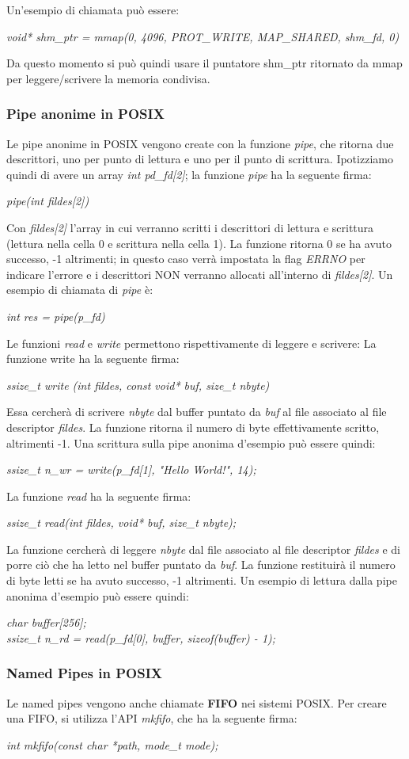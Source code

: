 \documentclass[12pt]{article}
\begin{document}
Un'esempio di chiamata può essere:
\begin{center}
    \textit{void* shm\_ptr = mmap(0, 4096, PROT\_WRITE, MAP\_SHARED, shm\_fd, 0)}
\end{center}
Da questo momento si può quindi usare il puntatore shm\_ptr ritornato da mmap per leggere/scrivere la memoria condivisa.
\subsubsection{Pipe anonime in POSIX}
Le pipe anonime in POSIX vengono create con la funzione \textit{pipe}, che ritorna due descrittori, uno per punto di lettura e uno per il punto di scrittura.
Ipotizziamo quindi di avere un array \textit{int pd\_fd[2]}; la funzione \textit{pipe} ha la seguente firma:
\begin{center}
    \textit{pipe(int fildes[2])}
\end{center}
Con \textit{fildes[2]} l'array in cui verranno scritti i descrittori di lettura e scrittura (lettura nella cella 0 e scrittura nella cella 1). La funzione ritorna 0 se ha avuto successo, -1 altrimenti; in questo caso
verrà impostata la flag \textit{ERRNO} per indicare l'errore e i descrittori NON verranno allocati all'interno di \textit{fildes[2]}. Un esempio di chiamata di \textit{pipe} è:
\begin{center}
    \textit{int res = pipe(p\_fd)}
\end{center}
Le funzioni \textit{read} e \textit{write} permettono rispettivamente di leggere e scrivere: \newline
La funzione write ha la seguente firma:
\begin{center}
    \textit{ssize\_t write (int fildes, const void* buf, size\_t nbyte)}
\end{center}
Essa cercherà di scrivere \textit{nbyte} dal buffer puntato da \textit{buf} al file associato al file descriptor \textit{fildes}.
La funzione ritorna il numero di byte effettivamente scritto, altrimenti -1.
Una scrittura sulla pipe anonima d'esempio può essere quindi:
\begin{center}
    \textit{ssize\_t n\_wr = write(p\_fd[1], "Hello World!", 14);}
\end{center}
La funzione \textit{read} ha la seguente firma:
\begin{center}
    \textit{ssize\_t read(int fildes, void* buf, size\_t nbyte);}
\end{center}
La funzione cercherà di leggere \textit{nbyte} dal file associato al file descriptor \textit{fildes} e di porre ciò che ha letto
nel buffer puntato da \textit{buf}. La funzione restituirà il numero di byte letti se ha avuto successo, -1 altrimenti.
Un esempio di lettura dalla pipe anonima d'esempio può essere quindi:
\begin{center}
    \textit{char buffer[256];} \\
    \textit{ssize\_t n\_rd = read(p\_fd[0], buffer, sizeof(buffer) - 1);}
\end{center}
\subsubsection{Named Pipes in POSIX}
Le named pipes vengono anche chiamate \textbf{FIFO} nei sistemi POSIX. Per creare una FIFO, si utilizza l'API \textit{mkfifo}, che ha la seguente firma:
\begin{center}
    \textit{int mkfifo(const char *path, mode\_t mode);}
\end{center}
\end{document}
